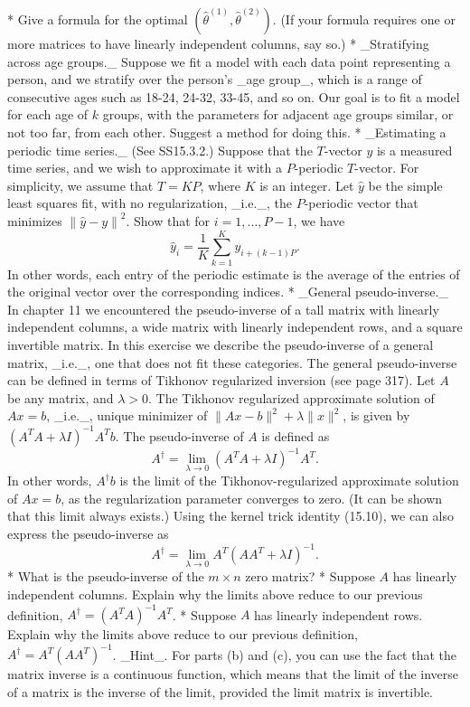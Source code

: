* Give a formula for the optimal \((\hat{\theta}^{(1)},\hat{\theta}^{(2)})\). (If your formula requires one or more matrices to have linearly independent columns, say so.)
* _Stratifying across age groups._ Suppose we fit a model with each data point representing a person, and we stratify over the person's _age group_, which is a range of consecutive ages such as 18-24, 24-32, 33-45, and so on. Our goal is to fit a model for each age of \(k\) groups, with the parameters for adjacent age groups similar, or not too far, from each other. Suggest a method for doing this.
* _Estimating a periodic time series._ (See SS15.3.2.) Suppose that the \(T\)-vector \(y\) is a measured time series, and we wish to approximate it with a \(P\)-periodic \(T\)-vector. For simplicity, we assume that \(T=KP\), where \(K\) is an integer. Let \(\hat{y}\) be the simple least squares fit, with no regularization, _i.e._, the \(P\)-periodic vector that minimizes \(\left\|\hat{y}-y\right\|^{2}\). Show that for \(i=1,\ldots,P-1\), we have \[\hat{y}_{i}=\frac{1}{K}\sum_{k=1}^{K}y_{i+(k-1)P}.\] In other words, each entry of the periodic estimate is the average of the entries of the original vector over the corresponding indices.
* _General pseudo-inverse._ In chapter 11 we encountered the pseudo-inverse of a tall matrix with linearly independent columns, a wide matrix with linearly independent rows, and a square invertible matrix. In this exercise we describe the pseudo-inverse of a general matrix, _i.e._, one that does not fit these categories. The general pseudo-inverse can be defined in terms of Tikhonov regularized inversion (see page 317). Let \(A\) be any matrix, and \(\lambda>0\). The Tikhonov regularized approximate solution of \(Ax=b\), _i.e._, unique minimizer of \(\|Ax-b\|^{2}+\lambda\|x\|^{2}\), is given by \((A^{T}A+\lambda I)^{-1}A^{T}b\). The pseudo-inverse of \(A\) is defined as \[A^{\dagger}=\lim_{\lambda\to 0}(A^{T}A+\lambda I)^{-1}A^{T}.\] In other words, \(A^{\dagger}b\) is the limit of the Tikhonov-regularized approximate solution of \(Ax=b\), as the regularization parameter converges to zero. (It can be shown that this limit always exists.) Using the kernel trick identity (15.10), we can also express the pseudo-inverse as \[A^{\dagger}=\lim_{\lambda\to 0}A^{T}(AA^{T}+\lambda I)^{-1}.\]
* What is the pseudo-inverse of the \(m\times n\) zero matrix?
* Suppose \(A\) has linearly independent columns. Explain why the limits above reduce to our previous definition, \(A^{\dagger}=(A^{T}A)^{-1}A^{T}\).
* Suppose \(A\) has linearly independent rows. Explain why the limits above reduce to our previous definition, \(A^{\dagger}=A^{T}(AA^{T})^{-1}\). _Hint_. For parts (b) and (c), you can use the fact that the matrix inverse is a continuous function, which means that the limit of the inverse of a matrix is the inverse of the limit, provided the limit matrix is invertible.
 